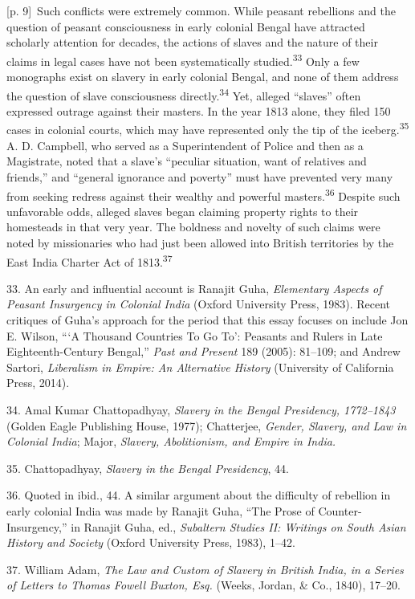 \documentclass[10pt,a4paper]{article}
\begin{document}
{\scriptsize\color{gray} [p. 9]}\ Such conflicts were extremely common. While peasant rebellions and the question of peasant consciousness in early colonial Bengal have attracted scholarly attention for decades, the actions of slaves and the nature of their claims in legal cases have not been systematically studied.\nobreak\textsuperscript{33} Only a few monographs exist on slavery in early colonial Bengal, and none of them address the question of slave consciousness directly.\nobreak\textsuperscript{34} Yet, alleged “slaves” often expressed outrage against their masters. In the year 1813 alone, they filed 150 cases in colonial courts, which may have represented only the tip of the iceberg.\nobreak\textsuperscript{35} A. D. Campbell, who served as a Superintendent of Police and then as a Magistrate, noted that a slave’s “peculiar situation, want of relatives and friends,” and “general ignorance and poverty” must have prevented very many from seeking redress against their wealthy and powerful masters.\nobreak\textsuperscript{36} Despite such unfavorable odds, alleged slaves began claiming property rights to their homesteads in that very year. The boldness and novelty of such claims were noted by missionaries who had just been allowed into British territories by the East India Charter Act of 1813.\nobreak\textsuperscript{37}\par{\small 33. An early and influential account is Ranajit Guha, \textit{Elementary Aspects of Peasant Insurgency in Colonial India} (Oxford University Press, 1983). Recent critiques of Guha’s approach for the period that this essay focuses on include Jon E. Wilson, “‘A Thousand Countries To Go To’: Peasants and Rulers in Late Eighteenth-Century Bengal,” \textit{Past and Present} 189 (2005): 81–109; and Andrew Sartori, \textit{Liberalism in Empire: An Alternative History} (University of California Press, 2014).\par}{\small 34. Amal Kumar Chattopadhyay, \textit{Slavery in the Bengal Presidency, 1772–1843} (Golden Eagle Publishing House, 1977); Chatterjee, \textit{Gender, Slavery, and Law in Colonial India}; Major, \textit{Slavery, Abolitionism, and Empire in India.}\par}{\small 35. Chattopadhyay, \textit{Slavery in the Bengal Presidency}, 44.\par}{\small 36. Quoted in ibid., 44. A similar argument about the difficulty of rebellion in early colonial India was made by Ranajit Guha, “The Prose of Counter-Insurgency,” in Ranajit Guha, ed., \textit{Subaltern Studies II: Writings on South Asian History and Society} (Oxford University Press, 1983), 1–42.\par}{\small 37. William Adam, \textit{The Law and Custom of Slavery in British India, in a Series of Letters to Thomas Fowell Buxton, Esq.} (Weeks, Jordan, \& Co., 1840), 17–20.\par}
\end{document}

